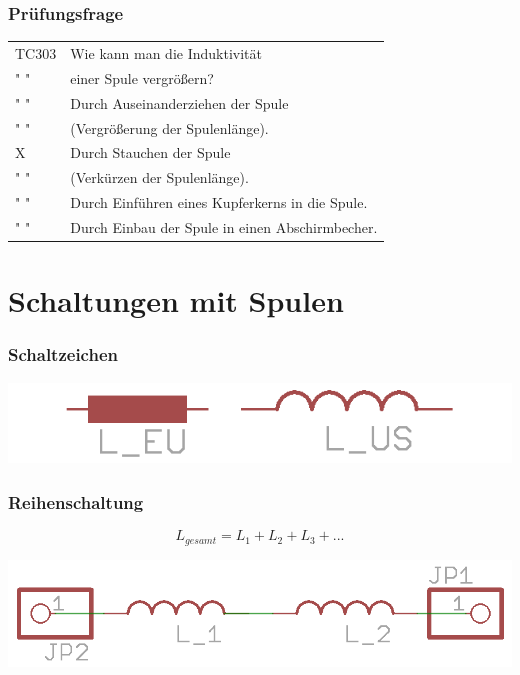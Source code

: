 \begin{frame}
    \frametitle{Prüfungsfrage}

    \begin{center}
    \begin{tabular}{l||l}\hline
        TC303 & Wie kann man die Induktivität\\
         " "  & einer Spule vergrößern?\\\hline\hline
        " " & Durch Auseinanderziehen der Spule \\
        " " & (Vergrößerung der Spulenlänge). \\ \hline
    	X & Durch Stauchen der Spule \\
        " " & (Verkürzen der Spulenlänge). \\ \hline
        " " &  Durch Einführen eines Kupferkerns in die Spule. \\ \hline
        " " & Durch Einbau der Spule in einen Abschirmbecher. \\ \hline
    \end{tabular}
 	    \end{center}
\end{frame}

\section*{Schaltungen mit Spulen}

\begin{frame}
    \frametitle{Schaltzeichen}
    \begin{center}
        \includegraphics[width=1\textwidth]{e06/Spule-schaltZ.png}
    \end{center}
\end{frame}

\begin{frame}
    \frametitle{Reihenschaltung}
    
    $$L_{gesamt} = L_1 + L_2 + L_3 + ...$$

    
    \begin{center}
        \includegraphics[width=1\textwidth]{e06/L_Reihe.png}
    \end{center}
	
\end{frame}

